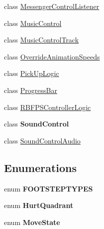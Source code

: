\begin{DoxyCompactItemize}
\item 
class \hyperlink{class_f_p_s_control_1_1_messenger_control_listener}{Messenger\-Control\-Listener}
\item 
class \hyperlink{class_f_p_s_control_1_1_music_control}{Music\-Control}
\item 
class \hyperlink{class_f_p_s_control_1_1_music_control_track}{Music\-Control\-Track}
\item 
class \hyperlink{class_f_p_s_control_1_1_override_animation_speeds}{Override\-Animation\-Speeds}
\item 
class \hyperlink{class_f_p_s_control_1_1_pick_up_logic}{Pick\-Up\-Logic}
\item 
class \hyperlink{class_f_p_s_control_1_1_progress_bar}{Progress\-Bar}
\item 
class \hyperlink{class_f_p_s_control_1_1_r_b_f_p_s_controller_logic}{R\-B\-F\-P\-S\-Controller\-Logic}
\item 
class {\bfseries Sound\-Control}
\item 
class \hyperlink{class_f_p_s_control_1_1_sound_control_audio}{Sound\-Control\-Audio}
\end{DoxyCompactItemize}
\subsection*{Enumerations}
\begin{DoxyCompactItemize}
\item 
enum {\bfseries F\-O\-O\-T\-S\-T\-E\-P\-T\-Y\-P\-E\-S} 
\item 
enum {\bfseries Hurt\-Quadrant} 
\item 
enum {\bfseries Move\-State} 
\end{DoxyCompactItemize}
